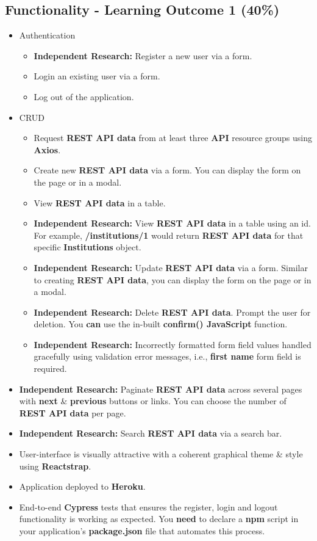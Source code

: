 \documentclass{article}
\begin{document}
\subsection*{Functionality - Learning Outcome 1 (40\%)}
\begin{itemize}
  \item Authentication
        \begin{itemize}
          \item \textbf{Independent Research:} Register a new user via a form.
          \item Login an existing user via a form.
          \item Log out of the application.
        \end{itemize}
  \item CRUD
        \begin{itemize}
          \item Request \textbf{REST API data} from at least three \textbf{API} resource groups using \textbf{Axios}.
          \item Create new \textbf{REST API data} via a form. You can display the form on the page or in a modal.
          \item View \textbf{REST API data} in a table.
          \item \textbf{Independent Research:} View \textbf{REST API data} in a table using an id. For example, \textbf{/institutions/1} would return \textbf{REST API data} for that specific \textbf{Institutions} object.
          \item \textbf{Independent Research:} Update \textbf{REST API data} via a form. Similar to creating \textbf{REST API data}, you can display the form on the page or in a modal.
          \item \textbf{Independent Research:} Delete \textbf{REST API data}. Prompt the user for deletion. You \textbf{can} use the in-built \textbf{confirm() JavaScript} function.
          \item \textbf{Independent Research:} Incorrectly formatted form field values handled gracefully using validation error messages, i.e., \textbf{first name} form field is required.
        \end{itemize}
  \item \textbf{Independent Research:} Paginate \textbf{REST API data} across several pages with \textbf{next} \& \textbf{previous} buttons or links. You can choose the number of \textbf{REST API data} per page.
  \item \textbf{Independent Research:} Search \textbf{REST API data} via a search bar.
  \item User-interface is visually attractive with a coherent graphical theme \& style using \textbf{Reactstrap}.
  \item Application deployed to \textbf{Heroku}.
  \item End-to-end \textbf{Cypress} tests that ensures the register, login and logout functionality is working as expected. You \textbf{need} to declare a \textbf{npm} script in your application's \textbf{package.json} file that automates this process.
\end{itemize}
\end{document}
